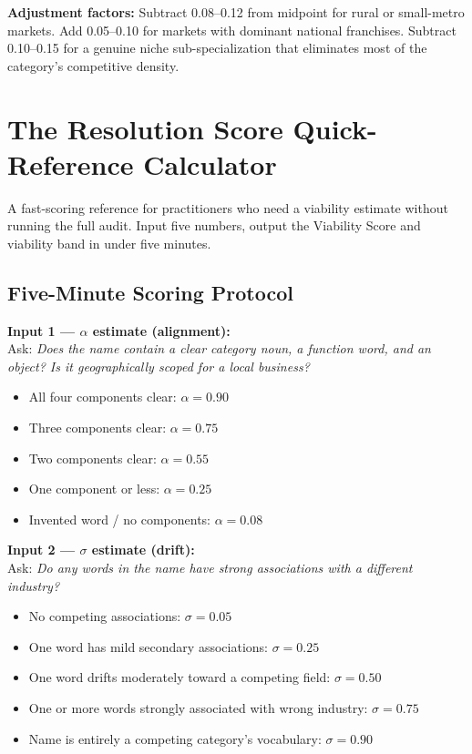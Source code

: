 \documentclass[12pt, openany]{book}
\theoremstyle{thmstyle}
\theoremstyle{defstyle}
\begin{document}
\textbf{Adjustment factors:} Subtract 0.08--0.12 from midpoint for rural or small-metro markets. Add 0.05--0.10 for markets with dominant national franchises. Subtract 0.10--0.15 for a genuine niche sub-specialization that eliminates most of the category's competitive density.

\chapter{The Resolution Score Quick-Reference Calculator}

\begin{appbox}[Purpose]
A fast-scoring reference for practitioners who need a viability estimate without running the full audit. Input five numbers, output the Viability Score and viability band in under five minutes.
\end{appbox}

\section*{Five-Minute Scoring Protocol}

\textbf{Input 1 --- $\alpha$ estimate (alignment):}\\
Ask: \textit{Does the name contain a clear category noun, a function word, and an object? Is it geographically scoped for a local business?}
\begin{itemize}[leftmargin=1.5em, topsep=2pt]
  \item All four components clear: $\alpha = 0.90$
  \item Three components clear: $\alpha = 0.75$
  \item Two components clear: $\alpha = 0.55$
  \item One component or less: $\alpha = 0.25$
  \item Invented word / no components: $\alpha = 0.08$
\end{itemize}

\textbf{Input 2 --- $\sigma$ estimate (drift):}\\
Ask: \textit{Do any words in the name have strong associations with a different industry?}
\begin{itemize}[leftmargin=1.5em, topsep=2pt]
  \item No competing associations: $\sigma = 0.05$
  \item One word has mild secondary associations: $\sigma = 0.25$
  \item One word drifts moderately toward a competing field: $\sigma = 0.50$
  \item One or more words strongly associated with wrong industry: $\sigma = 0.75$
  \item Name is entirely a competing category's vocabulary: $\sigma = 0.90$
\end{itemize}
\end{document}
